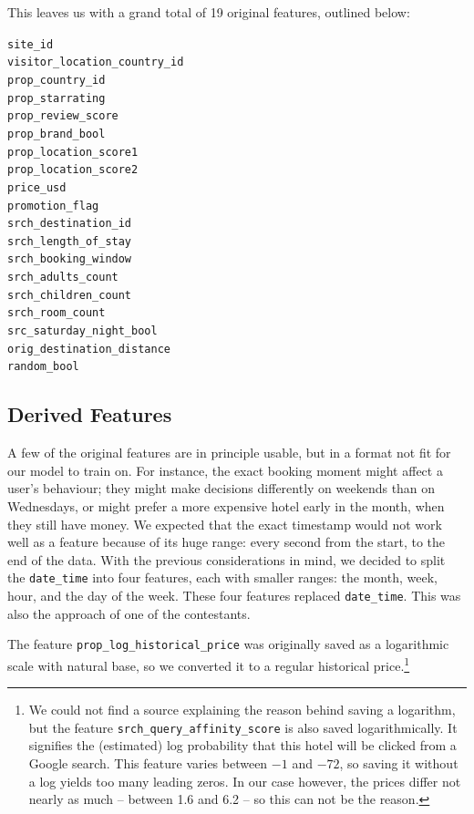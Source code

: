\documentclass[runningheads,a4paper]{llncs}
\begin{document}
This leaves us with a grand total of 19 original features, outlined below:
\begin{multicols}{3}   
    \noindent
    \verb|site_id| \\
    \verb|visitor_location_country_id| \\
    \verb|prop_country_id| \\
    \verb|prop_starrating| \\
    \verb|prop_review_score| \\
    \verb|prop_brand_bool| \\
    \verb|prop_location_score1| \\
    \verb|prop_location_score2| \\
    \verb|price_usd| \\
    \verb|promotion_flag| \\
    \verb|srch_destination_id| \\
    \verb|srch_length_of_stay| \\
    \verb|srch_booking_window| \\
    \verb|srch_adults_count| \\
    \verb|srch_children_count| \\
    \verb|srch_room_count| \\
    \verb|src_saturday_night_bool| \\
    \verb|orig_destination_distance| \\
    \verb|random_bool|
\end{multicols}

\subsection{Derived Features}
A few of the original features are in principle usable, but in a format not fit
for our model to train on. For instance, the exact booking moment might affect a
user's behaviour; they might make decisions differently on weekends than on 
Wednesdays, or might prefer a more expensive hotel early in the month, when they
still have money. We expected that the exact timestamp would not work well as a feature because of its huge range: every second from the start, to the end of the data. With the previous considerations in mind, we decided to split the \verb|date_time| into four features, each with smaller ranges: the month, week, hour, and the day of the week. These four features replaced \verb|date_time|. This was also the approach of one of the contestants. \cite{wind}

The feature \verb|prop_log_historical_price| was originally saved as a logarithmic 
scale with natural base,\cite{kaggle:forums} so we converted it to a regular historical price.\footnote{We
  could not find a source explaining the reason behind saving a logarithm, but 
  the feature \texttt{srch\_query\_affinity\_score} is
  also saved logarithmically. It signifies the (estimated) log probability that this 
  hotel will be clicked from a Google search. This feature varies between $-1$ 
  and $-72$, so saving it without a log yields too many leading zeros. In our case
  however, the prices differ not nearly as much -- between 1.6 and 6.2 -- so this can not 
  be the reason.}
\end{document}
